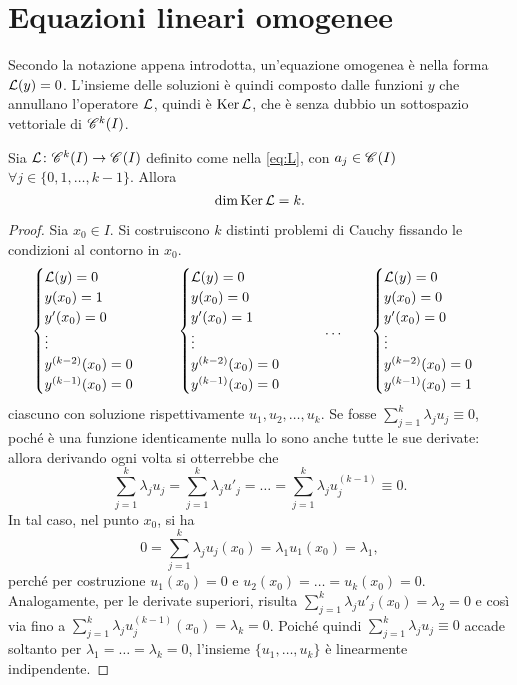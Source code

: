 \section{Equazioni lineari omogenee}
Secondo la notazione appena introdotta, un'equazione omogenea è nella forma $\lin(y)=0$. L'insieme delle soluzioni è quindi composto dalle funzioni $y$ che annullano l'operatore $\lin$, quindi è $\Ker\lin$, che è senza dubbio un sottospazio vettoriale di $\cont[k]{I}$.
\begin{teorema} \label{t:k-soluzioni}
Sia $\lin\colon\cont[k]{I}\to\cont{I}$ definito come nella \eqref{eq:L}, con $a_j\in\cont{I}$ $\forall j\in\{0,1,\dots,k-1\}$. Allora
\[
\dim\Ker\lin=k.
\]
\end{teorema}
\begin{proof}
Sia $x_0\in I$. Si costruiscono $k$ distinti problemi di Cauchy fissando le condizioni al contorno in $x_0$.
\begin{equation*}
	\begin{cases}
		\lin(y)=0\\y(x_0)=1\\y'(x_0)=0\\\vdots\\y^{(k-2)}(x_0)=0\\y^{(k-1)}(x_0)=0
	\end{cases}
	\qquad
	\begin{cases}
		\lin(y)=0\\y(x_0)=0\\y'(x_0)=1\\\vdots\\y^{(k-2)}(x_0)=0\\y^{(k-1)}(x_0)=0
	\end{cases}
	\qquad\dots\qquad
	\begin{cases}
		\lin(y)=0\\y(x_0)=0\\y'(x_0)=0\\\vdots\\y^{(k-2)}(x_0)=0\\y^{(k-1)}(x_0)=1
	\end{cases}
\end{equation*}
ciascuno con soluzione rispettivamente $u_1,u_2,\dots,u_k$.
Se fosse $\sum_{j=1}^k\lambda_ju_j\equiv 0$, poché è una funzione identicamente nulla lo sono anche tutte le sue derivate: allora derivando ogni volta si otterrebbe che
\begin{equation*}
	\sum_{j=1}^k\lambda_ju_j=\sum_{j=1}^k\lambda_ju'_j=\dots=\sum_{j=1}^k\lambda_ju^{(k-1)}_j\equiv 0.
\end{equation*}
In tal caso, nel punto $x_0$, si ha
\begin{equation*}
	0=\sum_{j=1}^k\lambda_ju_j(x_0)=\lambda_1u_1(x_0)=\lambda_1,
\end{equation*}
perché per costruzione $u_1(x_0)=0$ e $u_2(x_0)=\dots=u_k(x_0)=0$. Analogamente, per le derivate superiori, risulta $\sum_{j=1}^k\lambda_ju'_j(x_0)=\lambda_2=0$ e così via fino a $\sum_{j=1}^k\lambda_ju^{(k-1)}_j(x_0)=\lambda_k=0$. Poiché quindi $\sum_{j=1}^k\lambda_ju_j\equiv 0$ accade soltanto per $\lambda_1=\dots=\lambda_k=0$, l'insieme $\{u_1,\dots,u_k\}$ è linearmente indipendente.


\end{proof}
